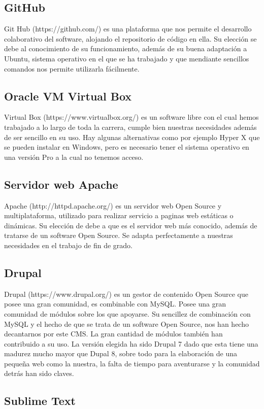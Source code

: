 \subsection{GitHub}
Git Hub (https://github.com/) es una plataforma que nos permite el desarrollo colaborativo del software, alojando el repositorio de código en ella.
Su elección se debe al conocimiento de su funcionamiento, además de su buena adaptación a Ubuntu, sistema operativo en el que se ha trabajado y que mendiante sencillos comandos nos permite utilizarla fácilmente.

\subsection{Oracle VM Virtual Box}
Virtual Box (https://www.virtualbox.org/) es un software libre con el cual hemos trabajado a lo largo de toda la carrera, cumple bien nuestras necesidades además de ser sencillo en su uso. Hay algunas alternativas como por ejemplo Hyper X que se pueden instalar en Windows, pero es necesario tener el sistema operativo en una versión Pro a la cual no tenemos acceso.

\subsection{Servidor web Apache}
Apache (http://httpd.apache.org/) es un servidor web Open Source y multiplataforma, utilizado para realizar servicio a paginas web estáticas o dinámicas.
Su elección de debe a que es el servidor web más conocido, además de tratarse de un software Open Source. Se adapta perfectamente a nuestras necesidades en el trabajo de fin de grado.


\subsection{Drupal}
Drupal (https://www.drupal.org/) es un gestor de contenido Open Source que posee una gran comunidad, es combinable con MySQL. Posee una gran comunidad de módulos sobre los que apoyarse.
Su sencillez de combinación con MySQL y el hecho de que se trata de un software Open Source, nos han hecho decantarnos por este CMS. La gran cantidad de módulos también han contribuido a su uso.
La versión elegida ha sido Drupal 7 dado que esta tiene una madurez mucho mayor que Dupal 8, sobre todo para la elaboración de una pequeña web como la nuestra, la falta de tiempo para aventurarse y la comunidad detrás han sido claves.

\subsection{Sublime Text}

